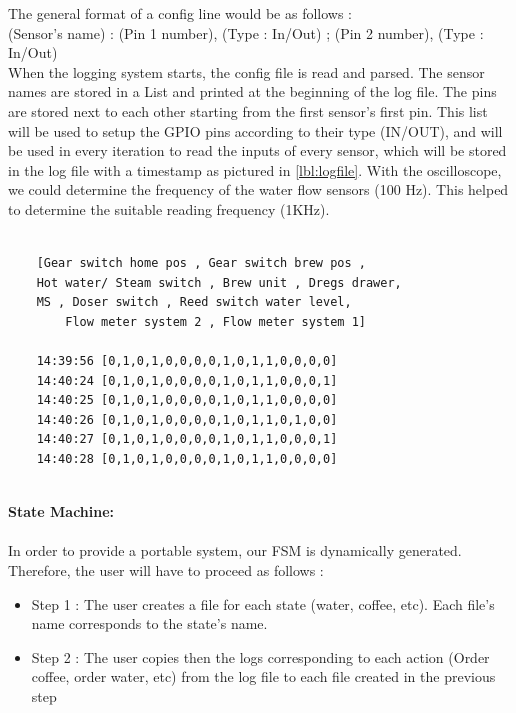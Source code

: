 \documentclass[12pt]{article}
\begin{document}
  The general format of a config line would be as follows :\\ (Sensor's name) : (Pin 1 number), (Type : In/Out) ; (Pin 2 number), (Type : In/Out)\\
  When the logging system starts, the config file is read and parsed. The sensor names are stored in a List and printed at the beginning of the log file.
  The pins are stored next to each other starting from the first sensor's first pin. This list will be used to setup the GPIO pins according to their type (IN/OUT),
  and will be used in every iteration to read the inputs of every sensor, which will be stored in the log file with a timestamp as pictured in \ref{lbl:logfile}.
  With the oscilloscope, we could determine the frequency of the water flow sensors (100 Hz). This helped to determine the suitable reading frequency (1KHz).\\
  \begin{lstlisting}[caption={Example of a log file}, label={lbl:logfile}]
  
    [Gear switch home pos , Gear switch brew pos , 
	Hot water/ Steam switch , Brew unit , Dregs drawer,
	MS , Doser switch , Reed switch water level,
	    Flow meter system 2 , Flow meter system 1]
	
	14:39:56 [0,1,0,1,0,0,0,0,1,0,1,1,0,0,0,0]
	14:40:24 [0,1,0,1,0,0,0,0,1,0,1,1,0,0,0,1]
	14:40:25 [0,1,0,1,0,0,0,0,1,0,1,1,0,0,0,0]
	14:40:26 [0,1,0,1,0,0,0,0,1,0,1,1,0,1,0,0]
	14:40:27 [0,1,0,1,0,0,0,0,1,0,1,1,0,0,0,1]
	14:40:28 [0,1,0,1,0,0,0,0,1,0,1,1,0,0,0,0]
	
  \end{lstlisting}
  \textbf{State Machine:}\\~\\
  In order to provide a portable system, our FSM is dynamically generated. Therefore, the user will have to proceed as follows :
  \begin{itemize}
   \item Step 1 : The user creates a file for each state (water, coffee, etc). Each file's name corresponds to the state's name.
   \item Step 2 : The user copies then the logs corresponding to each action (Order coffee, order water, etc) from the log file to each file created in the previous step
  \end{itemize}
\end{document}
